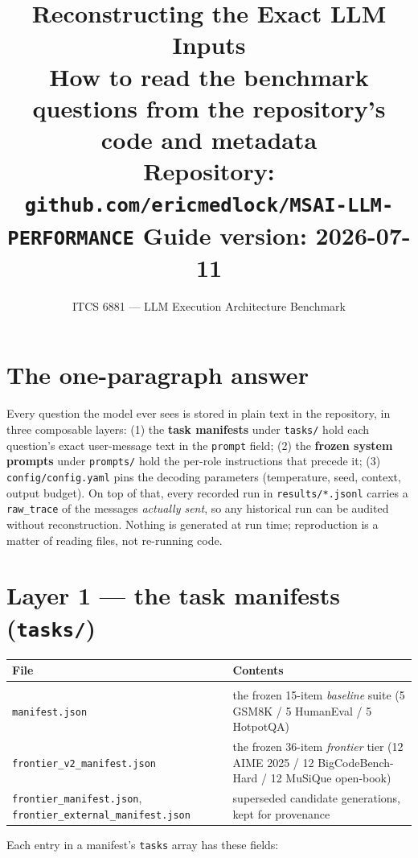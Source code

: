 \documentclass[11pt]{article}
\title{Reconstructing the Exact LLM Inputs\\
\large How to read the benchmark questions from the repository's code and metadata\\
\normalsize Repository: \texttt{github.com/ericmedlock/MSAI-LLM-PERFORMANCE} \quad Guide version: 2026-07-11}
\author{ITCS 6881 --- LLM Execution Architecture Benchmark}
\date{}
\newcommand{\field}[1]{\texttt{#1}}
\begin{document}
\maketitle
\thispagestyle{fancy}

\section*{The one-paragraph answer}

Every question the model ever sees is stored in plain text in the repository, in
three composable layers: (1) the \textbf{task manifests} under \texttt{tasks/}
hold each question's exact user-message text in the \field{prompt} field; (2) the
\textbf{frozen system prompts} under \texttt{prompts/} hold the per-role
instructions that precede it; (3) \texttt{config/config.yaml} pins the decoding
parameters (temperature, seed, context, output budget). On top of that, every
recorded run in \texttt{results/*.jsonl} carries a \field{raw\_trace} of the
messages \emph{actually sent}, so any historical run can be audited without
reconstruction. Nothing is generated at run time; reproduction is a matter of
reading files, not re-running code.

\section{Layer 1 --- the task manifests (\texttt{tasks/})}

\begin{tabular}{p{2.1in}p{3.9in}}
\textbf{File} & \textbf{Contents}\\
\hline\\[-8pt]
\texttt{manifest.json} & the frozen 15-item \emph{baseline} suite (5 GSM8K / 5 HumanEval / 5 HotpotQA)\\
\texttt{frontier\_v2\_manifest.json} & the frozen 36-item \emph{frontier} tier (12 AIME 2025 / 12 BigCodeBench-Hard / 12 MuSiQue open-book)\\
\texttt{frontier\_manifest.json}, \texttt{frontier\_external\_manifest.json} & superseded candidate generations, kept for provenance\\
\end{tabular}

Each entry in a manifest's \field{tasks} array has these fields:
\end{document}
